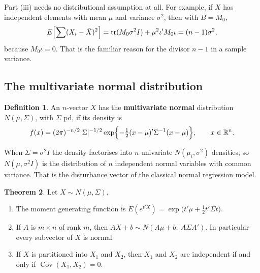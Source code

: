 \documentclass[11pt,a4paper]{article}
\numberwithin{equation}{section}
\DeclareMathOperator{\Cov}{Cov}
\DeclareMathOperator{\tr}{tr}
\theoremstyle{definition}
\newtheorem{thm}{Theorem}[subsection]
\newtheorem{defn}[thm]{Definition}
\begin{document}
Part (iii) needs no distributional assumption at all. For example, if $X$ has independent elements with mean $\mu$ and variance $\sigma^2$, then with
$B = M_0$,
\[
E\Bigl[\sum (X_i - \bar X)^2\Bigr] = \tr(M_0\sigma^2I) + \mu^2\iota'M_0\iota = (n - 1)\sigma^2 ,
\]
because $M_0\iota = 0$. That is the familiar reason for the divisor $n - 1$ in a sample variance.

\subsection{The multivariate normal distribution}
\label{ssec:mvn}

\begin{defn}
An $n$-vector $X$ has the \textbf{multivariate normal} distribution $N(\mu, \Sigma)$, with $\Sigma$ pd, if its density is
\[
f(x) = (2\pi)^{-n/2}|\Sigma|^{-1/2}\exp\Bigl\{-\tfrac12(x - \mu)'\Sigma^{-1}(x - \mu)\Bigr\}, \qquad x \in \mathbb R^n .
\]
\end{defn}

When $\Sigma = \sigma^2I$ the density factorises into $n$ univariate $N(\mu_i, \sigma^2)$ densities, so $N(\mu, \sigma^2I)$ is the distribution of $n$
independent normal variables with common variance. That is the disturbance vector of the classical normal regression model.

\begin{thm}
\label{thm:mvn}
Let $X \sim N(\mu, \Sigma)$.
\begin{enumerate}[label=(\roman*)]
\item The moment generating function is $E(e^{t'X}) = \exp\bigl(t'\mu + \frac12t'\Sigma t\bigr)$.
\item If $A$ is $m \times n$ of rank $m$, then $AX + b \sim N(A\mu + b,\ A\Sigma A')$. In particular every subvector of $X$ is normal.
\item If $X$ is partitioned into $X_1$ and $X_2$, then $X_1$ and $X_2$ are independent if and only if $\Cov(X_1, X_2) = 0$.
\end{enumerate}
\end{thm}
\end{document}
